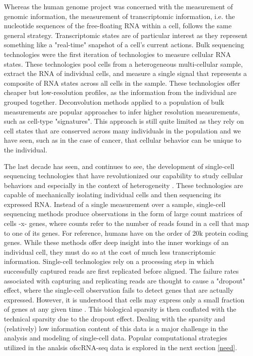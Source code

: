 Whereas the human genome project was concerned with the measurement of genomic information,
the measurement of transcriptomic information, i.e. the nucleotide sequences of the free-floating RNA within a cell, follows the same general strategy.
Transcriptomic states are of particular interest as they represent something like a "real-time" snapshot of a cell's current actions.
Bulk sequencing technologies were the first iteration of technologies to measure cellular RNA states.
These technologies pool cells from a heterogeneous multi-cellular sample,
extract the RNA of individual cells, and measure a single signal that represents a composite of RNA states across all cells in the sample.
These technologies offer cheaper but low-resolution profiles, as the information from the individual are grouped together.
Deconvolution methods applied to a population of bulk measurements are popular approaches to infer higher resolution measurements, such as cell-type "signatures".
This approach is still quite limited as they rely on cell states that are conserved across many individuals in the population and we have seen,
such as in the case of cancer, that cellular behavior can be unique to the individual.

The last decade has seen, and continues to see, the development of single-cell sequencing technologies
that have revolutionized our capability to study cellular behaviors and especially in the context of heterogeneity \cite{moty2014}.
These technologies are capable of mechanically isolating individual cells and then sequencing its expressed RNA.
Instead of a single measurement over a sample, single-cell sequencing methods produce observations in the form of large count matrices of cells -x- genes,
where counts refer to the number of reads found in a cell that map to one of its genes.
For reference, humans have on the order of 20k protein coding genes.
While these methods offer deep insight into the inner workings of an individual cell, they must do so at the cost of much less transcriptomic information.
Single-cell technologies rely on a processing step in which successfully captured reads are first replicated before aligned.
The failure rates associated with capturing and replicating reads are thought to cause a "dropout" effect, where the single-cell observation fails to detect genes that are actually expressed.
However, it is understood that cells may express only a small fraction of genes at any given time \cite{need}.
This biological sparsity is then conflated with the technical sparsity due to the dropout effect.
Dealing with the sparsity and (relatively) low information content of this data is a major challenge in the analysis and modeling of single-cell data.
Popular computational strategies utilized in the analsis ofscRNA-seq data is explored in the next section \ref{need}.

